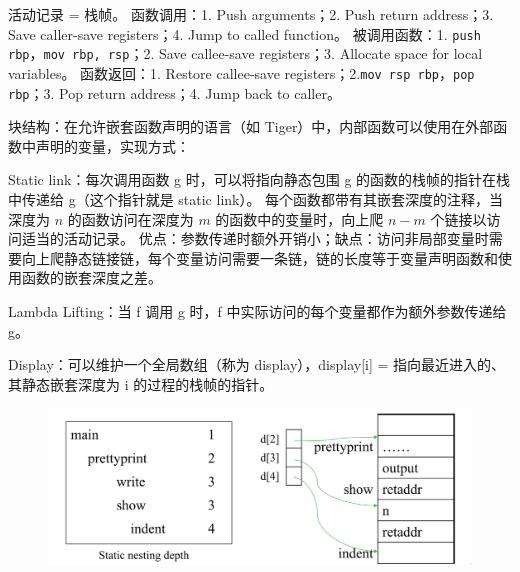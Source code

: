 \par \noindent 活动记录 = 栈帧。
函数调用：1. Push arguments；2. Push return address；3. Save caller-save registers；4. Jump to called function。
被调用函数：1. \texttt{push rbp}，\texttt{mov rbp, rsp}；2. Save callee-save registers；3. Allocate space for local variables。
函数返回：1. Restore callee-save registers；2.\texttt{mov rsp rbp}，\texttt{pop rbp}；3. Pop return address；4. Jump back to caller。

\par \noindent 块结构：在允许嵌套函数声明的语言（如 Tiger）中，内部函数可以使用在外部函数中声明的变量，实现方式：

\par \noindent Static link：每次调用函数 g 时，可以将指向静态包围 g 的函数的栈帧的指针在栈中传递给 g（这个指针就是 static link）。
每个函数都带有其嵌套深度的注释，当深度为 $n$ 的函数访问在深度为 $m$ 的函数中的变量时，向上爬 $n-m$ 个链接以访问适当的活动记录。
优点：参数传递时额外开销小；缺点：访问非局部变量时需要向上爬静态链接链，每个变量访问需要一条链，链的长度等于变量声明函数和使用函数的嵌套深度之差。

\par \noindent Lambda Lifting：当 f 调用 g 时，f 中实际访问的每个变量都作为额外参数传递给 g。

\par \noindent Display：可以维护一个全局数组（称为 display），display[i] = 指向最近进入的、其静态嵌套深度为 i 的过程的栈帧的指针。

\begin{figure}[H]
    \centering
    \includegraphics[width=0.8\linewidth]{figures/ar1.png}
\end{figure}

